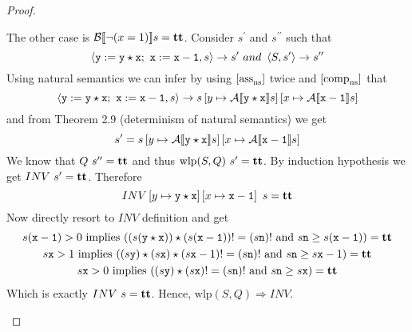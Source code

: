 \begin{proof}
\begin{enumerate}
		The other case is $\mathcal{B}[\![\neg(x=1)]\!] s=\textbf{tt}$. Consider $s^\prime$ and $s^{\prime\prime}$ such that 
		\begin{equation*}
		\nstrans{\mathtt{y:=y\star x;\ x:=x-1}}{s}{s^\prime}\ and\ \nstrans{S}{s^\prime}{s^{\prime\prime}}
		\end{equation*}
		Using natural semantics we can infer by using $\left[\text{ass}_{\text{ns}}^{\text{}}\right]$ twice and $\left[\text{comp}_{\text{ns}}^{\text{}}\right]$ that
		\begin{equation*}
		\nstrans{\mathtt{y:=y\star x;\ x:=x-1}}{s}{s\mapvar{y}{\aeval{\mathtt{y\star x}}{s}}\mapvar{x}{\aeval{\mathtt{x-1}}{s}}}
		\end{equation*}
		and from Theorem 2.9 (determinism of natural semantics) we get
		\begin{equation*}
		s^\prime=s\left[y \mapsto \mathcal{A}[\![\mathtt{y\star x}]\!] s\right]\left[x \mapsto \mathcal{A}[\![\mathtt{x-1}]\!] s\right]
		\end{equation*}
		We know that $Q\ s^{\prime\prime}=\textbf{tt}$ and thus $\mathrm{wlp}(S,Q)\ s^{\prime}=\textbf{tt}$. By induction hypothesis we get $INV\ s^\prime=\true$. Therefore
		\begin{equation*}
		INV\left[y \mapsto \mathtt{y\star x}\right]\left[x \mapsto \mathtt{x-1}\right]\ s=\textbf{tt}
		\end{equation*}
		Now directly resort to $INV$ definition and get
		\begin{gather*}
		s \mathtt{(x-1)}>0\ \mathrm{implies}\ ((s \mathtt{(y\star x)})\star(s \mathtt{(x-1)})!=(s \mathtt{n})!\ \mathrm{and}\ s \mathtt{n}\geq s \mathtt{(x-1)})=\textbf{tt} \\
		s \mathtt{x}>1\ \mathrm{implies}\ ((s \mathtt{y})\star(s \mathtt{x})\star(s \mathtt{x}-1)!=(s \mathtt{n})!\ \mathrm{and}\ s \mathtt{n}\geq s \mathtt{x}-1)=\textbf{tt} \\
		s \mathtt{x}>0\ \mathrm{implies}\ ((s \mathtt{y})\star(s \mathtt{x})!=(s \mathtt{n})!\ \mathrm{and}\ s \mathtt{n}\geq s \mathtt{x})=\textbf{tt} \\
		\end{gather*}
		Which is exactly $INV\ s=\true$. Hence, $\mathrm{wlp}(S,Q)\Rightarrow INV$.
	\end{enumerate}
\end{proof}
